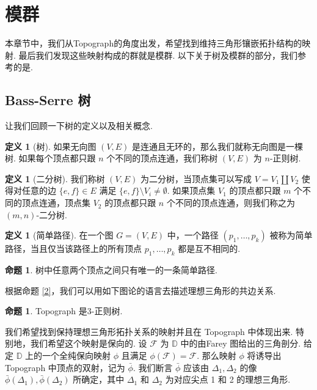 \documentclass[10pt,UTF8]{ctexart}
\newcommand{\D}{\mathbb{D}}
\theoremstyle{definition}
\newtheorem{proposition}[theorem]{命题}
\newtheorem{definition}[theorem]{定义}
\theoremstyle{remark}
\begin{document}
\section{模群}\label{sec: modular group}
本章节中，我们从Topograph的角度出发，希望找到维持三角形镶嵌拓扑结构的映射.
最后我们发现这些映射构成的群就是模群. 以下关于树及模群的部分，我们参考的是\cite{SerreTrees}.
\subsection{Bass-Serre 树}
让我们回顾一下树的定义以及相关概念. 
\begin{definition}[树]
    如果无向图 $(V,E)$ 是连通且无环的，那么我们就称无向图是一棵树. 如果每个顶点都只跟 $n$ 个不同的顶点连通，我们称树 $(V,E)$ 为 $n$-正则树.
\end{definition}

\begin{definition}[二分树]
   我们称树 $(V,E)$ 为二分树，当顶点集可以写成 $V= V_1\coprod V_2$ 使得对任意的边 $\{e,f\}\in E$ 满足 $\{e,f\}\setminus V_i \neq \emptyset.$ 
   如果顶点集 $V_1$ 的顶点都只跟 $m$ 个不同的顶点连通，顶点集 $V_2$ 的顶点都只跟 $n$ 个不同的顶点连通，则我们称之为 $(m,n)$-二分树. 
\end{definition}

\begin{definition}[简单路径]
    在一个图 $G = (V, E)$ 中，一个路径 $(p_1, \dots, p_k)$ 被称为简单路径，当且仅当该路径上的所有顶点 $p_1, \dots, p_k$ 都是互不相同的.
\end{definition}


\begin{proposition}
    树中任意两个顶点之间只有唯一的一条简单路径. 
\end{proposition}

根据命题 { \ref{2}}，我们可以用如下图论的语言去描述理想三角形的共边关系. 

\begin{proposition}
    Topograph 是3-正则树.  
\end{proposition}


我们希望找到保持理想三角形拓扑关系的映射并且在 Topograph 中体现出来. 特别地，我们希望这个映射是保向的. 
设 $\mathcal{F}$ 为 $\D$ 中的由Farey 图给出的三角剖分. 
给定 $\D$ 上的一个全纯保向映射 $\phi$ 且满足 $\phi(\mathcal{F})= \mathcal{F}$. 那么映射 $\phi$ 将诱导出 Topograph 中顶点的双射，记为 $\bar{\phi}$.
我们断言 $\bar{\phi}$ 应该由 $\Delta_1,\Delta_2$ 的像 $\bar{\phi}(\Delta_{1}),\bar{\phi}(\Delta_{2})$ 所确定，其中 $\Delta_1$ 和 $\Delta_2$ 为对应尖点 1 和 2 的理想三角形. 
\end{document}
